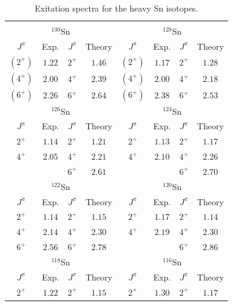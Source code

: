 \documentclass{article}
\begin{document}
\begin{table}[t]
\caption{Exitation spectra for the heavy Sn isotopes. \label{tab:sn132spectra}}
\vspace{0.2cm}
\begin{center}
\footnotesize
\begin{tabular}{|cccccccc|}
\hline
&&&&&&&\\[-5pt]
\multicolumn{4}{|c}{$^{130}$Sn}&\multicolumn{4}{c|}{$^{128}$Sn}\\
$J^{\pi}$&Exp.&$J^{\pi}$&Theory&$J^{\pi}$&Exp.&$J^{\pi}$&Theory\\
\hline
$(2^{+})$ & $1.22$ & $2^{+}$   & $1.46$ &$(2^{+})$ & $1.17$ & $2^{+}$ & $1.28$\\
$(4^{+})$ & $2.00$ & $4^{+}$   & $2.39$ &$(4^{+})$ & $2.00$ & $4^{+}$ & $2.18$\\
$(6^{+})$ & $2.26$ & $6^{+}$   & $2.64$ &$(6^{+})$ & $2.38$ & $6^{+}$ & $2.53$\\\hline
\multicolumn{4}{|c}{$^{126}$Sn}&\multicolumn{4}{c|}{$^{124}$Sn}\\
$J^{\pi}$&Exp.&$J^{\pi}$&Theory&$J^{\pi}$&Exp.&$J^{\pi}$&Theory\\\hline
$2^{+}$ & $1.14$ & $2^{+}$   & $1.21$ &$2^{+}$ & $1.13$ & $2^{+}$ & $1.17$\\
$4^{+}$ & $2.05$ & $4^{+}$   & $2.21$ &$4^{+}$ & $2.10$ & $4^{+}$ & $2.26$\\
$     $ &        & $6^{+}$   & $2.61$ &        &        & $6^{+}$ & $2.70$\\\hline
\multicolumn{4}{|c}{$^{122}$Sn}&\multicolumn{4}{c|}{$^{120}$Sn}\\
$J^{\pi}$&Exp.&$J^{\pi}$&Theory&$J^{\pi}$&Exp.&$J^{\pi}$&Theory\\
\hline
$2^{+}$   & $1.14$ & $2^{+}$   & $1.15$ & $2^{+}$  & $1.17$ & $2^{+}$ & $1.14$\\
$4^{+}$   & $2.14$ & $4^{+}$   & $2.30$ & $4^{+}$  & $2.19$ & $4^{+}$ & $2.30$\\
$6^{+}$   & $2.56$ & $6^{+}$   & $2.78$ &          &        & $6^{+}$ & $2.86$\\\hline
\multicolumn{4}{|c}{$^{118}$Sn}&\multicolumn{4}{c|}{$^{116}$Sn}\\
$J^{\pi}$&Exp.&$J^{\pi}$&Theory&$J^{\pi}$&Exp.&$J^{\pi}$&Theory\\
\hline
$2^{+}$   & $1.22$ & $2^{+}$   & $1.15$ & $2^{+}$  & $1.30$ & $2^{+}$ & $1.17$\\[3pt]\hline
\end{tabular}
\end{center}
\end{table}
\end{document}
